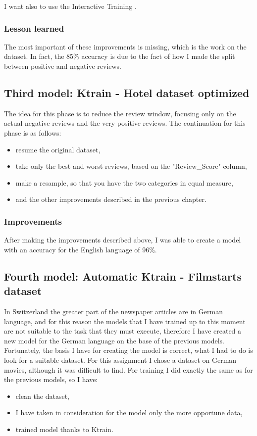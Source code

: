 I want also to use the Interactive Training \cite{jupyter_1204}.

\subsubsection{Lesson learned}
The most important of these improvements is missing, which is the work on the dataset.
In fact, the 85\% \gls{accuracy} is due to the fact of how I made the split between positive and negative reviews.


\subsection{Third model: Ktrain - Hotel dataset optimized}
The idea for this phase is to reduce the review window, focusing only on the actual negative reviews and the very positive reviews.
The continuation for this phase is as follows:
\begin{itemize}
    \item resume the original dataset,
    \item take only the best and worst reviews, based on the "Review\_Score" column,
    \item make a resample, so that you have the two categories in equal measure,
    \item and the other improvements described in the previous chapter.
\end{itemize}

\subsubsection{Improvements}
After making the improvements described above, I was able to create a model with an \gls{accuracy} for the English language of 96\%.

\subsection{Fourth model: Automatic Ktrain - Filmstarts dataset}
\label{chap:model filmstars auto}
In Switzerland the greater part of the newspaper articles are in German language, and for this reason the models that I have trained up to this moment are not suitable to the task that they must execute, therefore I have created a new model for the German language on the base of the previous models.
Fortunately, the basis I have for creating the model is correct, what I had to do is look for a suitable dataset.
For this assignment I chose a dataset on German movies, although it was difficult to find.
For training I did exactly the same as for the previous models, so I have:
\begin{itemize}
    \item clean the dataset,
    \item I have taken in consideration for the model only the more opportune data,
    \item trained model thanks to \gls{Ktrain}.
\end{itemize}

